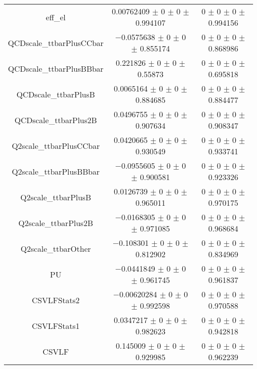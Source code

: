 \begin{table}
\begin{tabular}{ccc}
eff\_el 	& \num{0.00762409} $\pm$ \num{0} $\pm$ \num{0} $\pm$ \num{0.994107} 	& \num{0} $\pm$ \num{0} $\pm$ \num{0} $\pm$ \num{0.994156}\\
QCDscale\_ttbarPlusCCbar 	& \num{-0.0575638} $\pm$ \num{0} $\pm$ \num{0} $\pm$ \num{0.855174} 	& \num{0} $\pm$ \num{0} $\pm$ \num{0} $\pm$ \num{0.868986}\\
QCDscale\_ttbarPlusBBbar 	& \num{0.221826} $\pm$ \num{0} $\pm$ \num{0} $\pm$ \num{0.55873} 	& \num{0} $\pm$ \num{0} $\pm$ \num{0} $\pm$ \num{0.695818}\\
QCDscale\_ttbarPlusB 	& \num{0.0065164} $\pm$ \num{0} $\pm$ \num{0} $\pm$ \num{0.884685} 	& \num{0} $\pm$ \num{0} $\pm$ \num{0} $\pm$ \num{0.884477}\\
QCDscale\_ttbarPlus2B 	& \num{0.0496755} $\pm$ \num{0} $\pm$ \num{0} $\pm$ \num{0.907634} 	& \num{0} $\pm$ \num{0} $\pm$ \num{0} $\pm$ \num{0.908347}\\
Q2scale\_ttbarPlusCCbar 	& \num{0.0420665} $\pm$ \num{0} $\pm$ \num{0} $\pm$ \num{0.930549} 	& \num{0} $\pm$ \num{0} $\pm$ \num{0} $\pm$ \num{0.933741}\\
Q2scale\_ttbarPlusBBbar 	& \num{-0.0955605} $\pm$ \num{0} $\pm$ \num{0} $\pm$ \num{0.900581} 	& \num{0} $\pm$ \num{0} $\pm$ \num{0} $\pm$ \num{0.923326}\\
Q2scale\_ttbarPlusB 	& \num{0.0126739} $\pm$ \num{0} $\pm$ \num{0} $\pm$ \num{0.965011} 	& \num{0} $\pm$ \num{0} $\pm$ \num{0} $\pm$ \num{0.970175}\\
Q2scale\_ttbarPlus2B 	& \num{-0.0168305} $\pm$ \num{0} $\pm$ \num{0} $\pm$ \num{0.971085} 	& \num{0} $\pm$ \num{0} $\pm$ \num{0} $\pm$ \num{0.968684}\\
Q2scale\_ttbarOther 	& \num{-0.108301} $\pm$ \num{0} $\pm$ \num{0} $\pm$ \num{0.812902} 	& \num{0} $\pm$ \num{0} $\pm$ \num{0} $\pm$ \num{0.834969}\\
PU 	& \num{-0.0441849} $\pm$ \num{0} $\pm$ \num{0} $\pm$ \num{0.961745} 	& \num{0} $\pm$ \num{0} $\pm$ \num{0} $\pm$ \num{0.961837}\\
CSVLFStats2 	& \num{-0.00620284} $\pm$ \num{0} $\pm$ \num{0} $\pm$ \num{0.992598} 	& \num{0} $\pm$ \num{0} $\pm$ \num{0} $\pm$ \num{0.970588}\\
CSVLFStats1 	& \num{0.0347217} $\pm$ \num{0} $\pm$ \num{0} $\pm$ \num{0.982623} 	& \num{0} $\pm$ \num{0} $\pm$ \num{0} $\pm$ \num{0.942818}\\
CSVLF 	& \num{0.145009} $\pm$ \num{0} $\pm$ \num{0} $\pm$ \num{0.929985} 	& \num{0} $\pm$ \num{0} $\pm$ \num{0} $\pm$ \num{0.962239}\\

\end{tabular}
\end{table}
